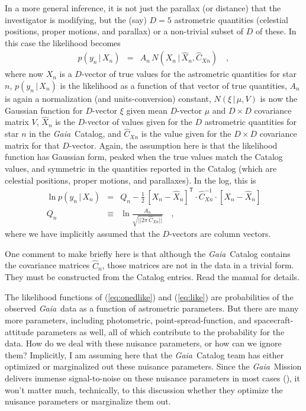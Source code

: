 \documentclass[12pt, modern]{aastex62}
\newcommand{\Gaia}{\textsl{Gaia}}
\newcommand{\given}{\,|\,}
\newcommand{\T}{^{\mathsf{T}}}
\newcommand{\inv}{^{-1}}
\begin{document}
In a more general inference, it is not just the parallax (or distance)
that the investigator is modifying, but the (say) $D=5$ astrometric quantities
(celestial positions, proper motions, and parallax)
or a non-trivial subset of $D$ of these.
In this case the likelihood becomes
\begin{eqnarray}
p(y_n\given X_n) &=& A_n\,N(X_n\given\hat{X}_n,\hat{C}_{Xn})
\label{eq:like}
\quad ,
\end{eqnarray}
where now
$X_n$ is a $D$-vector of true values for the astrometric quantities for star $n$,
$p(y_n\given X_n)$ is the likelihood as a function of that vector of true quantities,
$A_n$ is again a normalization (and units-conversion) constant,
$N(\xi\given\mu,V)$ is now the Gaussian function for $D$-vector $\xi$ given mean $D$-vector $\mu$ and $D\times D$ covariance matrix $V$,
$\hat{X}_n$ is the $D$-vector of values given for the $D$ astrometric quantities for star $n$ in the \Gaia\ Catalog,
and $\hat{C}_{Xn}$ is the value given for the $D\times D$ covariance matrix for that
$D$-vector.
Again, the assumption here is that the likelihood function has Gaussian form, peaked
when the true values match the Catalog values, and symmetric in the quantities
reported in the Catalog (which are celestial positions, proper motions, and parallaxes).
In the log, this is
\begin{eqnarray}
\ln p(y_n\given X_n) &=& Q_n - \frac{1}{2}\,[X_n - \hat{X}_n]\T\cdot\hat{C}_{Xn}\inv\cdot [X_n - \hat{X}_n]
\\
Q_n &\equiv& \ln\frac{A_n}{\sqrt{||2\pi\,\hat{C}_{Xn}||}}
\quad ,
\end{eqnarray}
where we have implicitly assumed that the $D$-vectors are column vectors.

One comment to make briefly here is that although the \Gaia\ Catalog contains
the covariance matrices $\hat{C}_n$, those matrices are not in the data in a
trivial form.
They must be constructed from the Catalog entries.
Read the manual for details.

The likelihood functions of (\ref{eq:onedlike}) and (\ref{eq:like}) are
probabilities of the observed \Gaia\ data as a
function of astrometric parameters.
But there are many more parameters, including photometric, point-spread-function,
and spacecraft-attitude parameters as well, all of which contribute to the probability
for the data.
How do we deal with these nuisance parameters, or how can we ignore them?
Implicitly, I am assuming here that the \Gaia\ Catalog team has either optimized
or marginalized out these nuisance parameters.
Since the \Gaia\ Mission delivers immense signal-to-noise on these nuisance
parameters in most cases (\citealt{holl}), it won't matter much, technically, to this
discussion whether they optimize
the nuisance parameters or marginalize them out.
\end{document}
